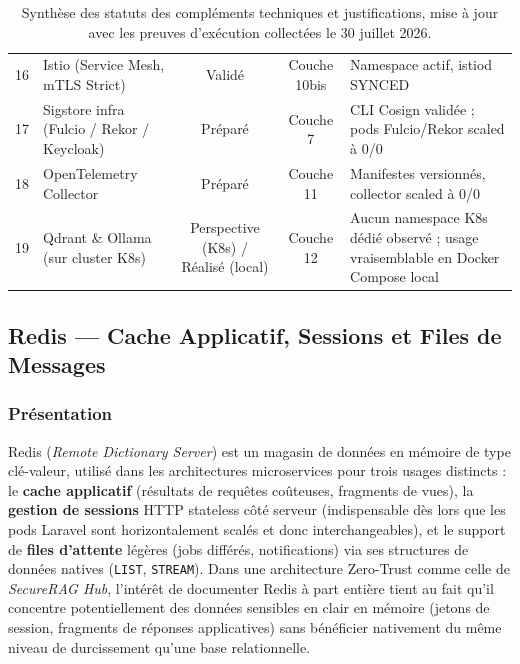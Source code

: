 \begin{table}[H]
\begin{tabularx}{\textwidth}{@{} c Z c c Z @{}}
16 & Istio (Service Mesh, mTLS Strict) & Validé & Couche 10bis & Namespace actif, istiod SYNCED \\
17 & Sigstore infra (Fulcio / Rekor / Keycloak) & Préparé & Couche 7 & CLI Cosign validée ; pods Fulcio/Rekor scaled à 0/0 \\
18 & OpenTelemetry Collector & Préparé & Couche 11 & Manifestes versionnés, collector scaled à 0/0 \\
19 & Qdrant \& Ollama (sur cluster K8s) & Perspective (K8s) / Réalisé (local) & Couche 12 & Aucun namespace K8s dédié observé ; usage vraisemblable en Docker Compose local \\
\bottomrule
\end{tabularx}
\caption{Synthèse des statuts des compléments techniques et justifications, mise à jour avec les preuves d'exécution collectées le 30 juillet 2026.}
\label{tab:complements_synthese_statuts}
\end{table}


\subsection{Redis — Cache Applicatif, Sessions et Files de Messages}
\label{subsec:redis_v2}

\subsubsection{Présentation}
Redis (\textit{Remote Dictionary Server}) est un magasin de données en mémoire de type clé-valeur, utilisé dans les architectures microservices pour trois usages distincts : le \textbf{cache applicatif} (résultats de requêtes coûteuses, fragments de vues), la \textbf{gestion de sessions} HTTP stateless côté serveur (indispensable dès lors que les pods Laravel sont horizontalement scalés et donc interchangeables), et le support de \textbf{files d'attente} légères (jobs différés, notifications) via ses structures de données natives (\texttt{LIST}, \texttt{STREAM}). Dans une architecture Zero-Trust comme celle de \textit{SecureRAG Hub}, l'intérêt de documenter Redis à part entière tient au fait qu'il concentre potentiellement des données sensibles en clair en mémoire (jetons de session, fragments de réponses applicatives) sans bénéficier nativement du même niveau de durcissement qu'une base relationnelle.

